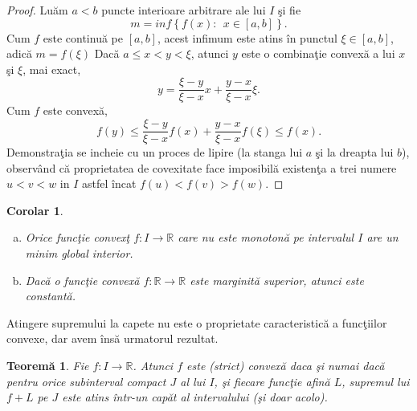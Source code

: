 \documentclass[a4paper,12pt,oneside]{report}
\newtheorem{theorem}{Teorem\u a}
\newtheorem{corollary}{Corolar}
\begin{document}
\begin{proof}
Lu\u{a}m \(a < b\) puncte interioare arbitrare ale lui \(I\) \c{s}i fie
\[m = inf\left \{ f\left ( x \right ): ~~x\in \left [ a,b \right ]\right \}.\] Cum \(f\) este continu\u{a} pe \(\left [ a,b \right ]\), acest infimum este atins \^{i}n punctul \(\xi \in \left [ a,b \right ]\), adic\u{a}
$
  m = f\left ( \xi  \right )
$
Dac\u{a} \(a \leq x <  y< \xi\), atunci \(y\) este o combina\c{t}ie convex\u{a} a lui \(x\) \c{s}i \(\xi\), mai exact, \[y = \frac{\xi -y}{\xi -x}x + \frac{y - x}{\xi -x}\xi.\] Cum \(f\) este convex\u{a},
\begin{displaymath}
  f\left ( y \right )\leq \frac{\xi -y}{\xi -x}f\left ( x \right )+ \frac{y-x}{\xi -x}f\left ( \xi  \right )\leq f\left ( x \right ).
\end{displaymath}
Demonstra\c{t}ia se incheie cu un proces de lipire (la stanga lui \(a\) \c{s}i la dreapta lui \(b\)), observ\^{a}nd c\u{a} proprietatea de covexitate face imposibil\u{a} existen\c{t}a a trei numere \(u < v < w\) in \(I\) astfel \^{i}ncat \(f\left ( u \right ) < f\left ( v \right )> f\left ( w \right )\).
\end{proof}

\begin{corollary}
\begin{enumerate}[a)]
\item Orice func\c{t}ie convex\c{t} \(f: I \rightarrow \mathbb{R}\) care nu este monoton\u{a} pe
intervalul \(I\) are un minim global interior.
\item Dac\u{a} o func\c{t}ie convex\u{a} \(f: \mathbb{R} \rightarrow \mathbb{R}\) este marginit\u{a} superior, atunci este constant\u{a}.
\end{enumerate}
\end{corollary}
Atingere supremului la capete nu este o proprietate caracteristic\u{a} a func\c{t}iilor convexe, dar avem \^{i}ns\u{a} urmatorul rezultat.

\begin{theorem}

Fie \(f: I \rightarrow \mathbb{R}\). Atunci \(f\) este (strict) convex\u{a} daca \c{s}i numai dac\u{a} pentru orice subinterval compact \(J\) al lui \(I\), \c{s}i fiecare func\c{t}ie afin\u{a} \(L\), supremul lui \(f+L\) pe \(J\) este atins \^{i}ntr-un cap\u{a}t al intervalului (\c{s}i doar acolo).
\end{theorem}
\end{document}
